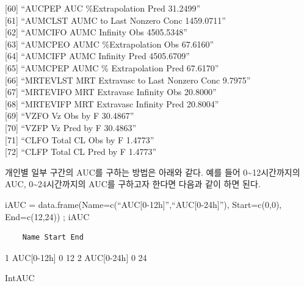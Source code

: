 \documentclass[]{krantz}
\makeatletter
\newenvironment{Shaded}{\begin{snugshade}}{\end{snugshade}}
\newcommand{\NormalTok}[1]{#1}
\renewenvironment{quote}{\begin{VF}}{\end{VF}}
\newenvironment{kframe}{%
\medskip{}
\setlength{\fboxsep}{.8em}
 \def\at@end@of@kframe{}%
 \ifinner\ifhmode%
  \def\at@end@of@kframe{\end{minipage}}%
  \begin{minipage}{\columnwidth}%
 \fi\fi%
 \def\FrameCommand##1{\hskip\@totalleftmargin \hskip-\fboxsep
 \colorbox{shadecolor}{##1}\hskip-\fboxsep
     \hskip-\linewidth \hskip-\@totalleftmargin \hskip\columnwidth}%
 \MakeFramed {\advance\hsize-\width
   \@totalleftmargin\z@ \linewidth\hsize
   \@setminipage}}%
 {\par\unskip\endMakeFramed%
 \at@end@of@kframe}
\renewenvironment{Shaded}{\begin{kframe}}{\end{kframe}}
\theoremstyle{definition}
\theoremstyle{definition}
\theoremstyle{definition}
\theoremstyle{remark}
\makeatother
\begin{document}
\begin{quote}
{[}60{]} ``AUCPEP AUC \%Extrapolation Pred 31.2499''\\
{[}61{]} ``AUMCLST AUMC to Last Nonzero Conc 1459.0711''\\
{[}62{]} ``AUMCIFO AUMC Infinity Obs 4505.5348''\\
{[}63{]} ``AUMCPEO AUMC \%Extrapolation Obs 67.6160''\\
{[}64{]} ``AUMCIFP AUMC Infinity Pred 4505.6709''\\
{[}65{]} ``AUMCPEP AUMC \% Extrapolation Pred 67.6170''\\
{[}66{]} ``MRTEVLST MRT Extravasc to Last Nonzero Conc 9.7975''\\
{[}67{]} ``MRTEVIFO MRT Extravasc Infinity Obs 20.8000''\\
{[}68{]} ``MRTEVIFP MRT Extravasc Infinity Pred 20.8004''\\
{[}69{]} ``VZFO Vz Obs by F 30.4867''\\
{[}70{]} ``VZFP Vz Pred by F 30.4863''\\
{[}71{]} ``CLFO Total CL Obs by F 1.4773''\\
{[}72{]} ``CLFP Total CL Pred by F 1.4773''
\end{quote}

개인별 일부 구간의 AUC를 구하는 방법은 아래와 같다. 예를 들어
0\textasciitilde{}12시간까지의 AUC, 0\textasciitilde{}24시간까지의 AUC를
구하고자 한다면 다음과 같이 하면 된다.

\begin{quote}
iAUC = data.frame(Name=c(``AUC{[}0-12h{]}'',``AUC{[}0-24h{]}''),
Start=c(0,0), End=c(12,24)) ; iAUC
\end{quote}

\begin{verbatim}
    Name Start End
\end{verbatim}

1 AUC{[}0-12h{]} 0 12 2 AUC{[}0-24h{]} 0 24

\begin{Shaded}
\begin{Highlighting}[]
\NormalTok{IntAUC}
\end{Highlighting}
\end{Shaded}
\end{document}
